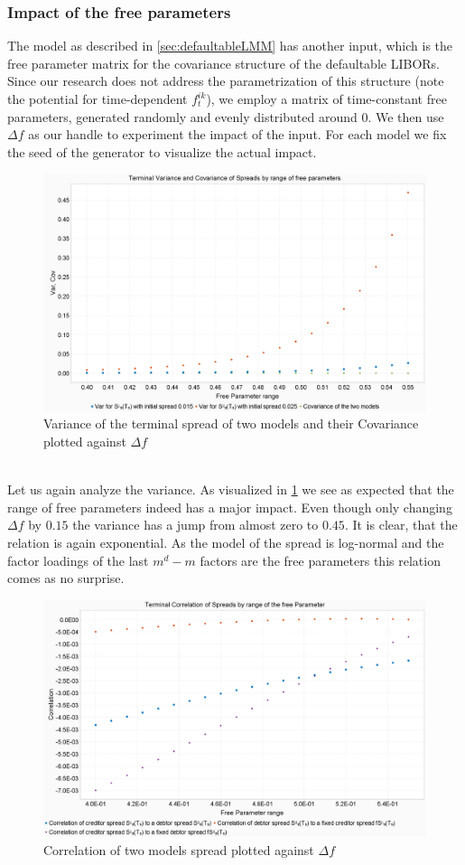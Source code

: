 \documentclass[12pt]{article}
\begin{document}
	\subsubsection{Impact of the free parameters}\label{sec:impactofdeltaf}
	The model as described in \cref{sec:defaultableLMM} has another input, which is the free parameter matrix for the covariance structure of the defaultable LIBORs. 
	Since our research does not address the parametrization of this structure (note the potential for time-dependent $f^{i k}_t$), we employ a matrix of time-constant free parameters, generated randomly and evenly distributed around 0. We then use $\Delta f$ as our handle to experiment the impact of the input. For each model we fix the seed of the generator to visualize the actual impact.
	\begin{figure}[h!]
		\centering
		\includegraphics[width=0.7\linewidth]{figures/Today/SpreadVarCovByFreeParameters}
		\caption{Variance of the terminal spread of two models and their Covariance plotted against $\Delta f$}
		\label{fig:spreadvarcovbyfreeparameters}
	\end{figure}
	\\Let us again analyze the variance. As visualized in \cref{fig:spreadvarcovbyfreeparameters} we see as expected that the range of free parameters indeed has a major impact. Even though only changing $\Delta f$ by $0.15$ the variance has a jump from almost zero to $0.45$. It is clear, that the relation is again exponential. As the model of the spread is log-normal and the factor loadings of the last $m^d - m$ factors are the free parameters this relation comes as no surprise.
	\begin{figure}[h!]
		\centering
		\includegraphics[width=0.7\linewidth]{figures/Today/SpreadCorrelationByFreeParameters}
		\caption{Correlation of two models spread plotted against $\Delta f$}
		\label{fig:spreadcorrelationbyfreeparameters}
	\end{figure}
\end{document}
